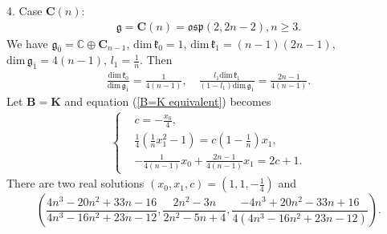 \documentclass[reqno]{amsart}
\theoremstyle{definition}
\begin{document}
4. Case $\mathbf{C}(n)$:
\begin{eqnarray*}
\mathfrak{g}=\mathbf{C}(n)=\mathfrak{osp}(2,2n-2),n\geq 3.
\end{eqnarray*}
We have
$\mathfrak{g}_{\bar{0}}=\mathbb{C}\oplus \mathbf{C}_{n-1}$, $\mathrm{dim}\,\mathfrak{k}_{0}=1$, $\mathrm{dim}\,\mathfrak{k}_{1}=(n-1)(2n-1)$, $\mathrm{dim}\,\mathfrak{g}_{\bar{1}}=4(n-1)$, $l_{1}=\frac{1}{n}$. Then
\begin{eqnarray*}
\frac{\mathrm{dim}\,\mathfrak{k}_{0}}{\mathrm{dim}\,\mathfrak{g}_{\bar{1}}}=\frac{1}{4(n-1)},\quad
\frac{l_{1}\mathrm{dim}\,\mathfrak{k}_{1}}{(1-l_{1})\mathrm{dim}\,\mathfrak{g}_{\bar{1}}}=\frac{2n-1}{4(n-1)}.
\end{eqnarray*}
Let $\mathbf{B}=\mathbf{K}$ and  equation (\ref{B=K equivalent}) becomes
\begin{eqnarray*}
\left\{
\begin{aligned}
&c=-\frac{x_{0}}{4},\\
&\frac{1}{4}\left(\frac{1}{n}x_{1}^{2}-1\right)=c\left(1-\frac{1}{n}\right)x_{1},\\
&-\frac{1}{4(n-1)}x_{0}+\frac{2n-1}{4(n-1)}x_{1}=2c+1.
\end{aligned}\right.
\end{eqnarray*}
There are two real solutions
$(x_{0},x_{1},c)=\left(1,1,-\frac{1}{4}\right)$ and
$$\left(\frac{4n^{3}-20 n^{2}+33n-16}{4n^{3}-16n^{2}+23n-12},
\frac{2n^{2}-3n}{2n^{2}-5n+4},
\frac{-4n^{3}+20 n^{2}-33n+16}{4(4n^{3}-16 n^{2}+23n-12)}\right).$$
\end{document}
